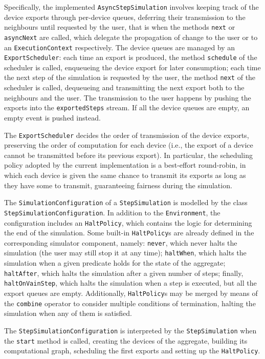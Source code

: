 Specifically, the implemented \texttt{AsyncStepSimulation} involves keeping
track of the device exports through per-device queues, deferring their
transmission to the neighbours until requested by the user, that is when the
methods \texttt{next} or \texttt{asyncNext} are called, which delegate the
propagation of change to the user or to an \texttt{ExecutionContext}
respectively. The device queues are managed by an \texttt{ExportScheduler}:
each time an export is produced, the method \texttt{schedule} of the scheduler
is called, enqueueing the device export for later consumption; each time the
next step of the simulation is requested by the user, the method \texttt{next}
of the scheduler is called, dequeueing and transmitting the next export both to
the neighbours and the user. The transmission to the user happens by pushing
the exports into the \texttt{exportedSteps} stream. If all the device queues
are empty, an empty event is pushed instead.

The \texttt{ExportScheduler} decides the order of transmission of the device
exports, preserving the order of computation for each device (i.e., the export
of a device cannot be transmitted before its previous export). In particular,
the scheduling policy adopted by the current implementation is a best-effort
round-robin, in which each device is given the same chance to transmit its
exports as long as they have some to transmit, guaranteeing fairness during the
simulation.

The \texttt{SimulationConfiguration} of a \texttt{StepSimulation} is modelled
by the class \texttt{StepSimulationConfiguration}. In addition to the
\texttt{Environment}, the configuration includes an \texttt{HaltPolicy}, which
contains the logic for determining the end of the simulation. Some built-in
\texttt{HaltPolicy}s are already defined in the corresponding simulator
component, namely: \texttt{never}, which never halts the simulation (the user
may still stop it at any time); \texttt{haltWhen}, which halts the simulation
when a given predicate holds for the state of the aggregate;
\texttt{halt\-After}, which halts the simulation after a given number of steps;
finally, \texttt{haltOnVainStep}, which halts the simulation when a step is
executed, but all the export queues are empty. Additionally,
\texttt{HaltPolicy}s may be merged by means of the \texttt{combine} operator to
consider multiple conditions of termination, halting the simulation when any of
them is satisfied.

The \texttt{StepSimulationConfiguration} is interpreted by the
\texttt{StepSimulation} when the \texttt{start} method is called, creating the
devices of the aggregate, building its computational graph, scheduling the
first exports and setting up the \texttt{HaltPolicy}.

